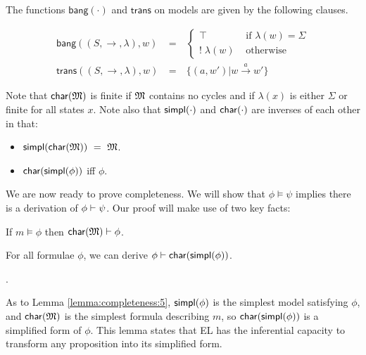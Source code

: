 \NI The functions $\mathsf{bang}(\cdot)$ and $\mathsf{trans}$ on
models are given by the following clauses.

\begin{eqnarray*}
  \mathsf{bang}((S,\rightarrow,\lambda),w) 
     & \ = \ & 
  \begin{cases}
    \top & \mbox{ if } \lambda(w) = \Sigma  \\
    ! \; \lambda(w) & \mbox{ otherwise }  
  \end{cases} \\
  \mathsf{trans}((S,\rightarrow, \lambda),w) & \ = \ & \{(a,w') | w \xrightarrow{a} w' \} 
\end{eqnarray*}

\NI Note that $\mathsf{char}(\frak{M})$ is finite if $\frak{M}$ contains no cycles and if
$\lambda(x)$ is either $\Sigma$ or finite for all states $x$.
Note also that $\mathsf{simpl}(\cdot)$ and $\mathsf{char}(\cdot)$ are inverses of each other in that:

\begin{itemize}

\item $\mathsf{simpl}(\mathsf{char}(\frak{M})) \ = \  \frak{M}$. 

\item $\mathsf{char}(\mathsf{simpl}(\phi))$ iff $\phi$.

\end{itemize}

\NI We are now ready to prove completeness.  We will show that $\phi
\models \psi$ implies there is a derivation of $\phi \vdash \psi$.  Our proof
will make use of two key facts:

\begin{lemma}\label{lemma:completeness:4}
If $m \models \phi$ then $\mathsf{char}(\frak{M}) \vdash \phi$.
\end{lemma}

\begin{lemma}\label{lemma:completeness:5}
For all formulae $\phi$, we can derive $\phi \vdash \mathsf{char}(\mathsf{simpl}(\phi))$.
\end{lemma}

.

As to Lemma \ref{lemma:completeness:5}, $\mathsf{simpl}(\phi)$ is the simplest model
satisfying $\phi$, and $\mathsf{char}(\frak{M})$ is the simplest formula describing
$m$, so $\mathsf{char}(\mathsf{simpl}(\phi))$ is a simplified form of $\phi$. This lemma
states that EL has the inferential capacity to transform any
proposition into its simplified form.


